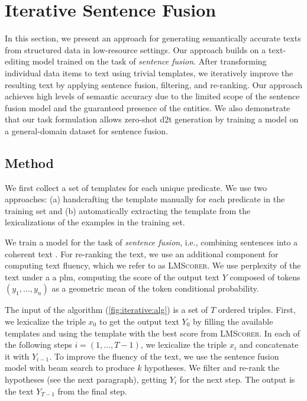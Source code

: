 \documentclass[12pt,notitlepage,a4paper,oneside,openany]{report}
\renewcommand\cite{\citep}
\begin{document}
\section{Iterative Sentence Fusion}
\label{sec:iterative}

In this section, we present an approach for generating semantically accurate texts from structured data in low-resource settings. Our approach builds on a text-editing model trained on the task of \emph{sentence fusion}. After transforming individual data items to text using trivial templates, we iteratively improve the resulting text by applying sentence fusion, filtering, and re-ranking.  Our approach achieves high levels of semantic accuracy due to the limited scope of the sentence fusion model and the guaranteed presence of the entities. We also demonstrate that our task formulation allows zero-shot \ac{d2t} generation by training a model on a general-domain dataset for sentence fusion.


\subsection{Method}
\label{sec:iterative:method}
We first collect a set of templates for each unique predicate. We use two approaches: (a) handcrafting the template manually for each predicate in the training set and (b) automatically extracting the template from the lexicalizations of the examples in the training set.

We train a model for the task of \emph{sentence fusion}, i.e., combining sentences into a coherent text \cite{barzilay2005sentence}. For re-ranking the text, we use an additional component for computing text fluency, which we refer to as \textsc{LMScorer}. We use perplexity of the text under a a \ac{plm}, computing the score of the output text $Y$ composed of tokens $(y_1, \ldots, y_n)$ as a geometric mean of the token conditional probability.

The input of the algorithm (\autoref{fig:iterative:alg}) is a set of $T$ ordered triples. First, we lexicalize the triple $x_0$ to get the output text $Y_0$ by filling the available templates and using the template with the best score from \textsc{LMScorer}.
In each of the following steps $i=(1, \ldots, T-1)$, we lexicalize the triple $x_i$ and concatenate it with $Y_{i-1}$.  To improve the fluency of the text, we use the sentence fusion model with beam search to produce $k$ hypotheses. We filter and re-rank the hypotheses (see the next paragraph), getting $Y_{i}$ for the next step. The output is the text $Y_{T-1}$ from the final step.
\end{document}
